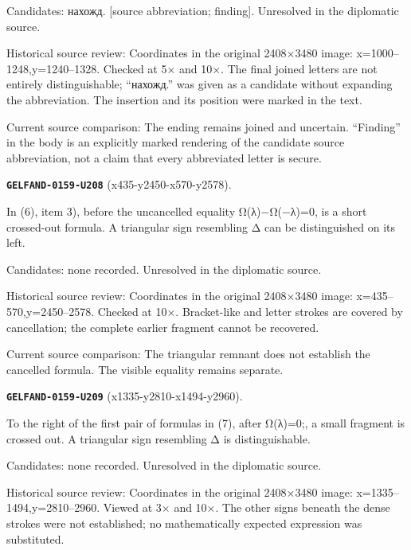 Candidates: нахожд. [source abbreviation; finding]. Unresolved in the diplomatic source.\par
Historical source review: Coordinates in the original 2408×3480 image: x=1000–1248,y=1240–1328. Checked at 5× and 10×. The final joined letters are not entirely distinguishable; “нахожд.” was given as a candidate without expanding the abbreviation. The insertion and its position were marked in the text.\par
Current source comparison: The ending remains joined and uncertain. “Finding” in the body is an explicitly marked rendering of the candidate source abbreviation, not a claim that every abbreviated letter is secure.\par\medskip
\par\noindent\leavevmode{}\label{GELFAND-0159-U208}\label{GELFAND-P001468:x435-y2450-x570-y2578}\textbf{\texttt{GELFAND-0159-U208}} (x435-y2450-x570-y2578).\nopagebreak[4]\par
In (6), item 3), before the uncancelled equality Ω(λ)−Ω(−λ)=0, is a short crossed-out formula. A triangular sign resembling Δ can be distinguished on its left.\par
Candidates: none recorded. Unresolved in the diplomatic source.\par
Historical source review: Coordinates in the original 2408×3480 image: x=435–570,y=2450–2578. Checked at 10×. Bracket-like and letter strokes are covered by cancellation; the complete earlier fragment cannot be recovered.\par
Current source comparison: The triangular remnant does not establish the cancelled formula. The visible equality remains separate.\par\medskip
\par\noindent\leavevmode{}\label{GELFAND-0159-U209}\label{GELFAND-P001468:x1335-y2810-x1494-y2960}\textbf{\texttt{GELFAND-0159-U209}} (x1335-y2810-x1494-y2960).\nopagebreak[4]\par
To the right of the first pair of formulas in (7), after Ω(λ)=0;, a small fragment is crossed out. A triangular sign resembling Δ is distinguishable.\par
Candidates: none recorded. Unresolved in the diplomatic source.\par
Historical source review: Coordinates in the original 2408×3480 image: x=1335–1494,y=2810–2960. Viewed at 3× and 10×. The other signs beneath the dense strokes were not established; no mathematically expected expression was substituted.\par
